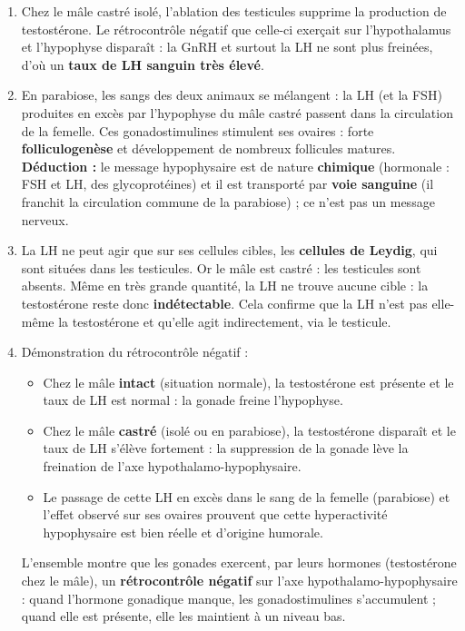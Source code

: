 \documentclass[11pt]{article}
\begin{document}
\begin{corrige}
\begin{enumerate}
\item Chez le mâle castré isolé, l'ablation des testicules supprime la production de testostérone. Le rétrocontrôle négatif que celle-ci exerçait sur l'hypothalamus et l'hypophyse disparaît : la GnRH et surtout la LH ne sont plus freinées, d'où un \textbf{taux de LH sanguin très élevé}.
\item En parabiose, les sangs des deux animaux se mélangent : la LH (et la FSH) produites en excès par l'hypophyse du mâle castré passent dans la circulation de la femelle. Ces gonadostimulines stimulent ses ovaires : forte \textbf{folliculogenèse} et développement de nombreux follicules matures. \textbf{Déduction :} le message hypophysaire est de nature \textbf{chimique} (hormonale : FSH et LH, des glycoprotéines) et il est transporté par \textbf{voie sanguine} (il franchit la circulation commune de la parabiose) ; ce n'est pas un message nerveux.
\item La LH ne peut agir que sur ses cellules cibles, les \textbf{cellules de Leydig}, qui sont situées dans les testicules. Or le mâle est castré : les testicules sont absents. Même en très grande quantité, la LH ne trouve aucune cible : la testostérone reste donc \textbf{indétectable}. Cela confirme que la LH n'est pas elle-même la testostérone et qu'elle agit indirectement, via le testicule.
\item Démonstration du rétrocontrôle négatif :
\begin{itemize}
\item Chez le mâle \textbf{intact} (situation normale), la testostérone est présente et le taux de LH est normal : la gonade freine l'hypophyse.
\item Chez le mâle \textbf{castré} (isolé ou en parabiose), la testostérone disparaît et le taux de LH s'élève fortement : la suppression de la gonade lève la freination de l'axe hypothalamo-hypophysaire.
\item Le passage de cette LH en excès dans le sang de la femelle (parabiose) et l'effet observé sur ses ovaires prouvent que cette hyperactivité hypophysaire est bien réelle et d'origine humorale.
\end{itemize}
L'ensemble montre que les gonades exercent, par leurs hormones (testostérone chez le mâle), un \textbf{rétrocontrôle négatif} sur l'axe hypothalamo-hypophysaire : quand l'hormone gonadique manque, les gonadostimulines s'accumulent ; quand elle est présente, elle les maintient à un niveau bas.
\end{enumerate}
\end{corrige}
\end{document}
